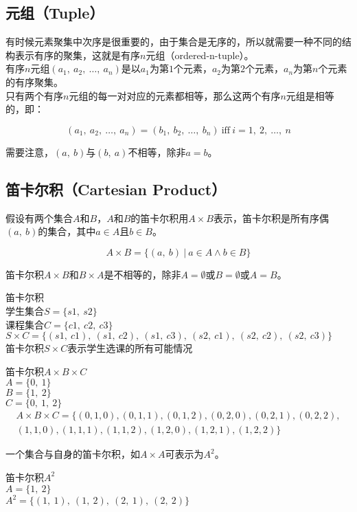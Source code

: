 \subsection{元组（Tuple）}

有时候元素聚集中次序是很重要的，由于集合是无序的，所以就需要一种不同的结构表示有序的聚集，这就是有序$ n $元组（ordered-n-tuple）。\\

有序$ n $元组$ (a_1,\ a_2,\ \dots,\ a_n) $是以$ a_1 $为第$ 1 $个元素，$ a_2 $为第$ 2 $个元素，$ a_n $为第$ n $个元素的有序聚集。\\

只有两个有序$ n $元组的每一对对应的元素都相等，那么这两个有序$ n $元组是相等的，即：

\vspace{-0.5cm}

$$
	(a_1,\ a_2,\ \dots,\ a_n) = (b_1,\ b_2,\ \dots,\ b_n)\ \text{iff}\ i = 1,\ 2,\ \dots,\ n
$$

需要注意，$ (a,\ b) $与$ (b,\ a) $不相等，除非$ a = b $。\\

\subsection{笛卡尔积（Cartesian Product）}

假设有两个集合$ A $和$ B $，$ A $和$ B $的笛卡尔积用$ A \times B $表示，笛卡尔积是所有序偶$ (a,\ b) $的集合，其中$ a \in A $且$ b \in B $。

\vspace{-0.5cm}

$$
	A \times B = \{(a,\ b)\ |\ a \in A \wedge b \in B\}
$$

笛卡尔积$ A \times B $和$ B \times A $是不相等的，除非$ A = \emptyset $或$ B = \emptyset $或$ A = B $。

\begin{tcolorbox}
	笛卡尔积\\
	学生集合$ S = \{s1,\ s2\} $\\
	课程集合$ C = \{c1,\ c2,\ c3\} $\\
	$ S \times C = \{(s1,\ c1),\ (s1,\ c2),\ (s1,\ c3),\ (s2,\ c1),\ (s2,\ c2),\ (s2,\ c3)\} $\\
	笛卡尔积$ S \times C $表示学生选课的所有可能情况\\
\end{tcolorbox}

\begin{tcolorbox}
	笛卡尔积$ A \times B \times C $\\
	$ A = \{0,\ 1\} $\\
	$ B = \{1,\ 2\} $\\
	$ C = \{0,\ 1,\ 2\} $
	\begin{align*}
		A \times B \times C = \{(0, 1, 0), (0, 1, 1), (0, 1, 2), (0, 2, 0), (0, 2, 1), (0, 2, 2), \\
		(1, 1, 0), (1, 1, 1), (1, 1, 2), (1, 2, 0), (1, 2, 1), (1, 2, 2)\}
	\end{align*}
\end{tcolorbox}

一个集合与自身的笛卡尔积，如$ A \times A $可表示为$ A^2 $。

\begin{tcolorbox}
	笛卡尔积$ A^2 $\\
	$ A = \{1,\ 2\} $\\
	$ A^2 = \{(1,\ 1),\ (1,\ 2),\ (2,\ 1),\ (2,\ 2)\} $
\end{tcolorbox}

\newpage